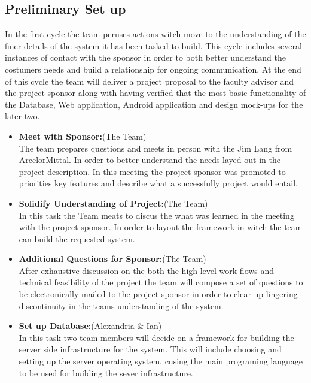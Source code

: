 \documentclass[Letter,11pt]{article}
\begin{document}
	\subsection{Preliminary Set up}\label{cyc1}
		In the first cycle the team peruses actions witch move to the understanding of the finer details of the system it has been tasked to build. This cycle includes several instances of contact with the sponsor in order to both better understand the costumers needs and build a relationship for ongoing communication. At the end of this cycle the team will deliver a project proposal to the faculty advisor and the project sponsor along with having verified that the most basic functionality of the Database, Web application, Android application and design mock-ups for the later two. 
		
		\begin{itemize}
			\item\textbf{Meet with Sponsor:}(The Team)\\
			The team prepares questions and meets in person with the Jim Lang from ArcelorMittal. In order to better understand the needs layed out in the project description. In this meeting the project sponsor was promoted to priorities key features and  describe what a successfully project would entail.
			
			\item \textbf{Solidify Understanding of Project:}(The Team)\\
			In this task the Team meats to discus the what was learned in the meeting with the project sponsor. In order to layout the framework in witch the team can build the requested system.
			
			\item\textbf{Additional Questions for Sponsor:}(The Team)\\
			After exhaustive discussion on the both the high level work flows and technical feasibility of the project the team will compose a set of questions to be electronically mailed to the project sponsor in order to clear up lingering discontinuity in the teams understanding of the system.
			
			\item\textbf{Set up Database:}(Alexandria \& Ian)\\
			In this task two team members will decide on a framework for building the server side infrastructure for the system. This will include choosing and setting up the server operating system, cusing the main programing language to be used for building the sever infrastructure.
			

\end{itemize}
\end{document}
